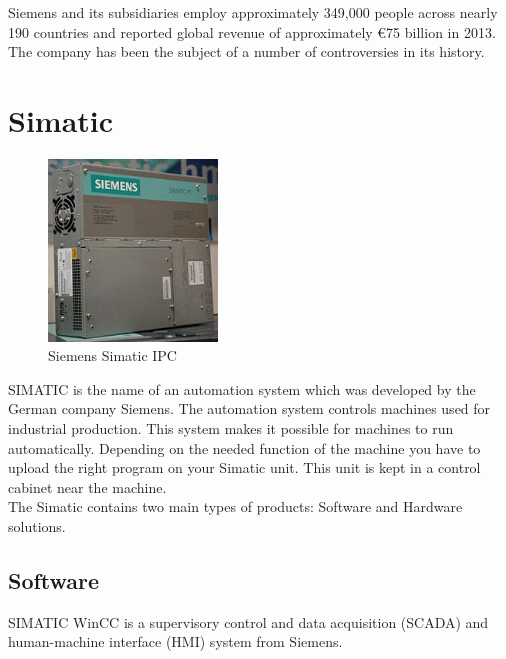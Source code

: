 \documentclass[english]{article}
\begin{document}
Siemens and its subsidiaries employ approximately 349,000 people across nearly 190 countries and reported global revenue of approximately \euro 75 billion in 2013. The company has been the subject of a number of controversies in its history.

\section{Simatic}

\begin{figure}
  \begin{center}
    \includegraphics[width=0.4\textwidth]{SiemensSimantic/220px-Boxpc627}
  \end{center}
  \caption{Siemens Simatic IPC}
\end{figure}

SIMATIC is the name of an automation system which was developed by the German company Siemens. The automation system controls machines used for industrial production. This system makes it possible for machines to run automatically. Depending on the needed function of the machine you have to upload the right program on your Simatic unit. This unit is kept in a control cabinet near the machine.\\


The Simatic contains two main types of products: Software and Hardware solutions.
\subsection{Software}
SIMATIC WinCC is a supervisory control and data acquisition (SCADA) and human-machine interface (HMI) system from Siemens.
\end{document}
